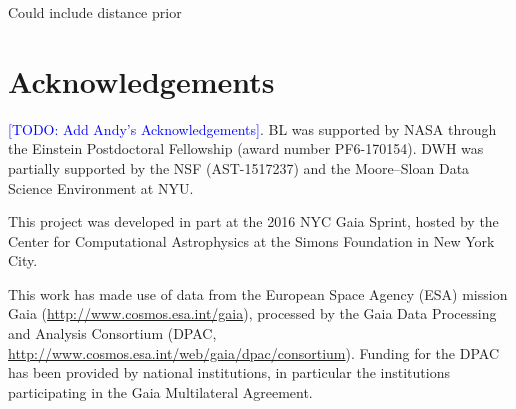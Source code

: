 \documentclass[aps,prd,showpacs,superscriptaddress,groupedaddress]{revtex4}  %
\newcommand{\todo}[1]{\textcolor{blue}{[TODO: #1]}}
\begin{document}
Could include distance prior



\section{Acknowledgements}

\todo{Add Andy's Acknowledgements}.
BL was supported by NASA through the Einstein Postdoctoral Fellowship (award number PF6-170154).
DWH was partially supported by the NSF (AST-1517237) and the Moore--Sloan Data Science Environment at NYU.

This project was developed in part at the 2016 NYC Gaia Sprint, hosted by the Center for Computational Astrophysics at the Simons Foundation in New York City.

This work has made use of data from the European Space Agency (ESA) mission Gaia (\url{http://www.cosmos.esa.int/gaia}), processed by the Gaia Data Processing and Analysis Consortium (DPAC, \url{http://www.cosmos.esa.int/web/gaia/dpac/consortium}). Funding for the DPAC has been provided by national institutions, in particular the institutions participating in the Gaia Multilateral Agreement.





\appendix

\end{document}
